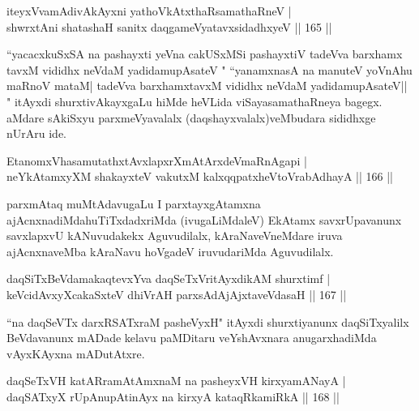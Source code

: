 \begin{shl}
iteyxVvamAdivAkAyxni yathoVkAtxthaRsamathaRneV |\\
shwrxtAni shatashaH sanitx daqgameVyatavxsidadhxyeV \hfill || 165 ||
\end{shl}

\begin{artha}%
 ``yacacxkuSxSA na pashayxti yeVna cakUSxMSi pashayxtiV tadeVva barxhamx tavxM vididhx neVdaM yadidamupAsateV  " ``yanamxnasA na manuteV yoVnAhu maRnoV mataM| tadeVva barxhamxtavxM vididhx neVdaM yadidamupAsateV|| " itAyxdi shurxtivAkayxgaLu hiMde heVLida viSayasamathaRneya bagegx. aMdare sAkiSxyu parxmeVyavalalx (daqshayxvalalx)\break veMbudara sididhxge nUrAru ide.
\end{artha}

\begin{shl}
EtanomxVhasamutathxtAvxlapxrXmAtArxdeVmaRnAgapi |\\
neYkAtamxyXM shakayxteV vakutxM kalxqqpatxheVtoVrabAdhayA \hfill || 166 ||
\end{shl}

\begin{artha}
parxmAtaq muMtAdavugaLu I parxtayxgAtamxna ajAcnxnadiMda\break huTiTxdadxriMda (ivugaLiMdaleV) EkAtamx savxrUpavanunx savxlapxvU kANuvudakekx Aguvudilalx, kAraNaveVneMdare iruva ajAcnxnaveMba kAraNavu hoVgadeV iruvudariMda Aguvudilalx. 
\end{artha}


\begin{shl}
daqSiTxBeVdamakaqtevxYva daqSeTxVritAyxdikAM shurxtimf |\\
keVcidAvxyXcakaSxteV dhiVrAH parxsAdAjAjxtaveVdasaH \hfill || 167 ||
\end{shl}

\begin{artha}
``na daqSeVTx darxRSATxraM pasheVyxH" itAyxdi shurxtiyanunx daqSiTxyalilx BeVdavanunx mADade kelavu paMDitaru veYshAvxnara anugarxhadiMda vAyxKAyxna mADutAtxre.
\end{artha}%


\begin{shl}
daqSeTxVH katARramAtAmxnaM na pasheyxVH kirxyamANayA |\\
daqSATxyX rUpAnupAtinAyx na kirxyA kataqRkamiRkA \hfill || 168 ||
\end{shl}

